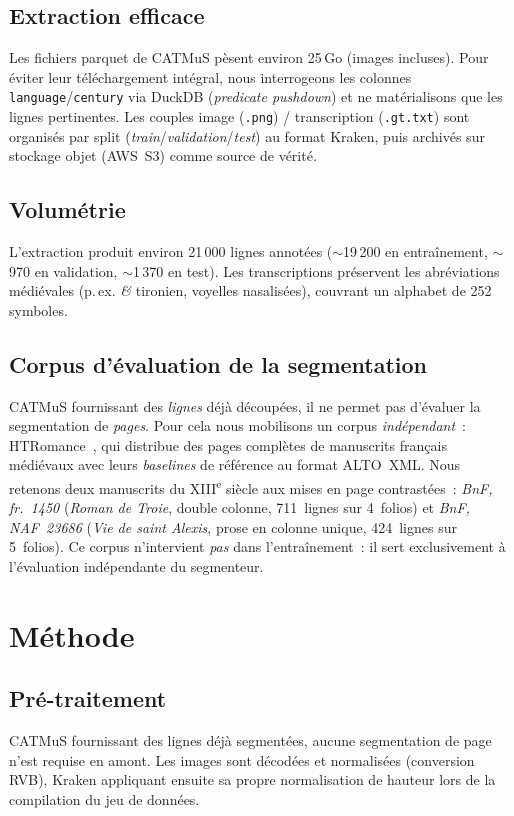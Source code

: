 \documentclass[10pt,journal,a4paper]{IEEEtran}
\begin{document}
\subsection{Extraction efficace}
Les fichiers parquet de CATMuS pèsent environ 25\,Go (images incluses). Pour
éviter leur téléchargement intégral, nous interrogeons les colonnes
\texttt{language}/\texttt{century} via DuckDB (\textit{predicate pushdown}) et ne
matérialisons que les lignes pertinentes. Les couples image (\texttt{.png}) /
transcription (\texttt{.gt.txt}) sont organisés par split
(\textit{train}/\textit{validation}/\textit{test}) au format Kraken, puis
archivés sur stockage objet (AWS~S3) comme source de vérité.

\subsection{Volumétrie}
L'extraction produit environ 21\,000 lignes annotées ($\sim$19\,200 en
entraînement, $\sim$970 en validation, $\sim$1\,370 en test). Les transcriptions
préservent les abréviations médiévales (p.\,ex. \textit{\&} tironien, voyelles
nasalisées), couvrant un alphabet de 252 symboles.

\subsection{Corpus d'évaluation de la segmentation}
CATMuS fournissant des \emph{lignes} déjà découpées, il ne permet pas d'évaluer
la segmentation de \emph{pages}. Pour cela nous mobilisons un corpus
\emph{indépendant}~: HTRomance~\cite{htromance}, qui distribue des pages
complètes de manuscrits français médiévaux avec leurs \textit{baselines} de
référence au format ALTO~XML. Nous retenons deux manuscrits du
XIII\textsuperscript{e} siècle aux mises en page contrastées~: \textit{BnF,
fr.~1450} (\textit{Roman de Troie}, double colonne, 711~lignes sur 4~folios) et
\textit{BnF, NAF~23686} (\textit{Vie de saint Alexis}, prose en colonne unique,
424~lignes sur 5~folios). Ce corpus n'intervient \emph{pas} dans
l'entraînement~: il sert exclusivement à l'évaluation indépendante du
segmenteur.

\section{Méthode}

\subsection{Pré-traitement}
CATMuS fournissant des lignes déjà segmentées, aucune segmentation de page n'est
requise en amont. Les images sont décodées et normalisées (conversion RVB),
Kraken appliquant ensuite sa propre normalisation de hauteur lors de la
compilation du jeu de données.
\end{document}
